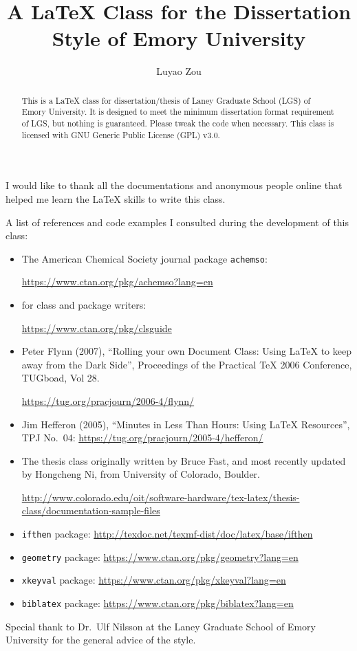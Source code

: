 \documentclass[final]{emory}
\title{A \LaTeX{} Class for the Dissertation Style of Emory University}
\author{Luyao Zou}                      %
\begin{document}
\begin{abstract}

This is a \LaTeX{} class for dissertation/thesis of Laney Graduate School (LGS) of Emory University.
It is designed to meet the minimum dissertation format
requirement of LGS, but nothing is guaranteed. Please tweak the
code when necessary. This class is licensed with GNU Generic Public License (GPL) v3.0.

\end{abstract}

\begin{acknowledgement}%

I would like to thank all the documentations and anonymous people online that
helped me learn the \LaTeX{} skills to write this class. 

A list of references and code examples I consulted during the development
of this class:
\begin{itemize}
  \item The American Chemical Society journal package \Verb|achemso|:
  
        \url{https://www.ctan.org/pkg/achemso?lang=en}
  \item \LaTeXe{} for class and package writers:
        
        \url{https://www.ctan.org/pkg/clsguide}
  \item Peter Flynn (2007), ``Rolling your own Document Class: Using \LaTeX{} to keep away from the Dark Side'', Proceedings of the Practical \TeX{} 2006 Conference, TUGboad, Vol 28.
        
        \url{https://tug.org/pracjourn/2006-4/flynn/}
  \item Jim Hefferon (2005), ``Minutes in Less Than Hours: Using \LaTeX{} Resources'', TPJ No.~04: 
        \url{https://tug.org/pracjourn/2005-4/hefferon/} 
  \item The thesis class originally written by Bruce Fast, and most recently updated by Hongcheng Ni, from University of Colorado, Boulder. 
        
        \url{http://www.colorado.edu/oit/software-hardware/tex-latex/thesis-class/documentation-sample-files}
  \item \Verb|ifthen| package: \url{http://texdoc.net/texmf-dist/doc/latex/base/ifthen}
  \item \Verb|geometry| package: \url{https://www.ctan.org/pkg/geometry?lang=en}
  \item \Verb|xkeyval| package: \url{https://www.ctan.org/pkg/xkeyval?lang=en}
  \item \Verb|biblatex| package: \url{https://www.ctan.org/pkg/biblatex?lang=en}
\end{itemize}

Special thank to Dr.~Ulf Nilsson at the Laney Graduate School of Emory University
for the general advice of the style.

\end{acknowledgement}
\end{document}
